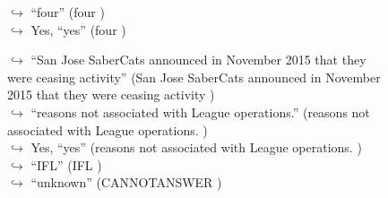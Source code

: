 \documentclass[11pt,a4paper, onecolumn]{article}
\begin{document}
\begin{figure}[t]
\begin{tcolorbox}[boxsep=0pt,left=5pt,right=0pt,top=2pt,colback = yellow!5]
\begin{dialogue}
\colorbox{pink!25}{$\hookrightarrow$}
{ ``four'' (four ) }
\\
\colorbox{pink!25}{$\hookrightarrow$}
\colorbox{red!25}{Yes,}
{ ``yes'' (four ) }
\\
 \end{dialogue}\end{tcolorbox}\end{figure}\begin{figure}[t] \small \begin{tcolorbox}[boxsep=0pt,left=5pt,right=0pt,top=2pt,colback = yellow!5] \begin{dialogue}
 \small 
\colorbox{pink!25}{$\hookrightarrow$}
{ ``San Jose SaberCats announced in November 2015 that they were ceasing activity'' (San Jose SaberCats announced in November 2015 that they were ceasing activity ) }
\\
\colorbox{pink!25}{$\hookrightarrow$}
{ ``reasons not associated with League operations.'' (reasons not associated with League operations. ) }
\\
\colorbox{pink!25}{$\hookrightarrow$}
\colorbox{red!25}{Yes,}
{ ``yes'' (reasons not associated with League operations. ) }
\\
\colorbox{pink!25}{$\hookrightarrow$}
{ ``IFL'' (IFL ) }
\\
\colorbox{pink!25}{$\hookrightarrow$}
{ ``unknown'' (CANNOTANSWER ) }
\\
 \end{dialogue}\end{tcolorbox}\end{figure}
\end{document}
